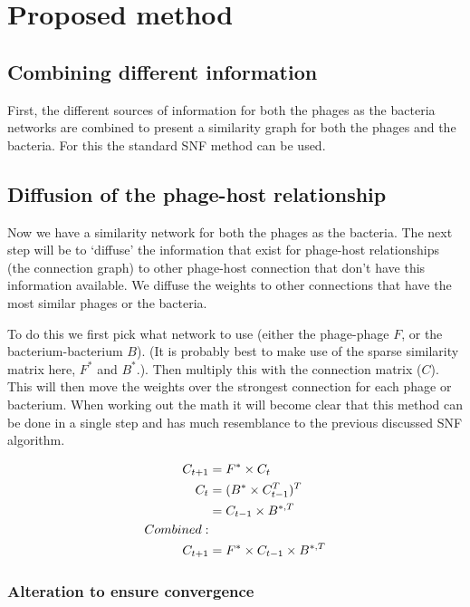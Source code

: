 \documentclass{article}
\begin{document}
\section{Proposed method}

\subsection{Combining different information}

First, the different sources of information for both the phages as the bacteria networks
are combined to present a similarity graph for both the phages and the bacteria.
For this the standard SNF method can be used.

\subsection{Diffusion of the phage-host relationship}

Now we have a similarity network for both the phages as the bacteria. 
The next step will be to `diffuse' the information that exist for phage-host 
relationships (the connection graph) 
to other phage-host connection that don't have this information
available.  
We diffuse the weights to other connections that have the most similar phages
or the bacteria.

To do this we first pick what network to use (either the phage-phage $F$, or 
the bacterium-bacterium $B$). (It is probably best to make use of the sparse
similarity matrix here, $F^*$ and $B^*$.).
Then multiply this with the connection matrix ($C$). This will then move the
weights over the strongest connection for each phage or bacterium.
When working out the math it will become clear that this method can be done in a single 
step and has much resemblance to the previous discussed SNF algorithm. 

\begin{align}
    \begin{split}
    C_{t+1} &= F^* \times C_t \\
    C_{t} &= (B^* \times C_{t - 1}^{T})^{T} \\
          &= C_{t - 1} \times B^{*,T} \\
    \hfil Combined: \\
    C_{t+1} &= F^* \times C_{t - 1} \times B^{*,T}
    \end{split}
\end{align}

\subsubsection{Alteration to ensure convergence}
\end{document}
